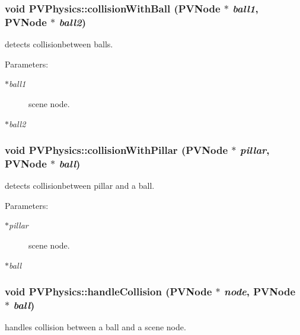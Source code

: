 \subsubsection[{collisionWithBall}]{\setlength{\rightskip}{0pt plus 5cm}void PVPhysics::collisionWithBall ({\bf PVNode} $\ast$ {\em ball1}, \/  {\bf PVNode} $\ast$ {\em ball2})}\label{class_p_v_physics_d55e28ab26fc818faf43231a3368294c}


detects collisionbetween balls. 

\begin{Desc}
\item[Parameters:]
\begin{description}
\item[{\em $\ast$ball1}]scene node. \item[{\em $\ast$ball2}]\end{description}
\end{Desc}
\subsubsection[{collisionWithPillar}]{\setlength{\rightskip}{0pt plus 5cm}void PVPhysics::collisionWithPillar ({\bf PVNode} $\ast$ {\em pillar}, \/  {\bf PVNode} $\ast$ {\em ball})}\label{class_p_v_physics_2e69d5b10735bec201d92e9206e618cb}


detects collisionbetween pillar and a ball. 

\begin{Desc}
\item[Parameters:]
\begin{description}
\item[{\em $\ast$pillar}]scene node. \item[{\em $\ast$ball}]\end{description}
\end{Desc}
\subsubsection[{handleCollision}]{\setlength{\rightskip}{0pt plus 5cm}void PVPhysics::handleCollision ({\bf PVNode} $\ast$ {\em node}, \/  {\bf PVNode} $\ast$ {\em ball})}\label{class_p_v_physics_43833f09fa8abc6114290d9161d14bb5}


handles collision between a ball and a scene node. 

